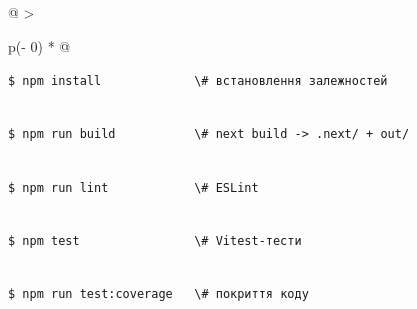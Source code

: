 \documentclass[
]{article}
\newcommand{\passthrough}[1]{#1}
\newcounter{none} %
\begin{document}
{\def\LTcaptype{none} %
\begin{longtable}[]{@{}
  >{\raggedright\arraybackslash}p{}@{}}
\toprule\noalign{}
\endhead
\bottomrule\noalign{}
\endlastfoot
\begin{minipage}[t]{\linewidth}\raggedright
\passthrough{\lstinline!$!}\passthrough{\lstinline! !}\passthrough{\lstinline!npm!}\passthrough{\lstinline! !}\passthrough{\lstinline!install!}\passthrough{\lstinline!             !}\passthrough{\lstinline!\#!}\passthrough{\lstinline! !}\passthrough{\lstinline!встановлення!}\passthrough{\lstinline! !}\passthrough{\lstinline!залежностей!}\strut \\
\passthrough{\lstinline!$!}\passthrough{\lstinline! !}\passthrough{\lstinline!npm!}\passthrough{\lstinline! !}\passthrough{\lstinline!run!}\passthrough{\lstinline! !}\passthrough{\lstinline!build!}\passthrough{\lstinline!           !}\passthrough{\lstinline!\#!}\passthrough{\lstinline! !}\passthrough{\lstinline!next!}\passthrough{\lstinline! !}\passthrough{\lstinline!build!}\passthrough{\lstinline! !}\passthrough{\lstinline!->!}\passthrough{\lstinline! !}\passthrough{\lstinline!.next/!}\passthrough{\lstinline! !}\passthrough{\lstinline!+!}\passthrough{\lstinline! !}\passthrough{\lstinline!out/!}\strut \\
\passthrough{\lstinline!$!}\passthrough{\lstinline! !}\passthrough{\lstinline!npm!}\passthrough{\lstinline! !}\passthrough{\lstinline!run!}\passthrough{\lstinline! !}\passthrough{\lstinline!lint!}\passthrough{\lstinline!            !}\passthrough{\lstinline!\#!}\passthrough{\lstinline! !}\passthrough{\lstinline!ESLint!}\strut \\
\passthrough{\lstinline!$!}\passthrough{\lstinline! !}\passthrough{\lstinline!npm!}\passthrough{\lstinline! !}\passthrough{\lstinline!test!}\passthrough{\lstinline!                !}\passthrough{\lstinline!\#!}\passthrough{\lstinline! !}\passthrough{\lstinline!Vitest-тести!}\strut \\
\passthrough{\lstinline!$!}\passthrough{\lstinline! !}\passthrough{\lstinline!npm!}\passthrough{\lstinline! !}\passthrough{\lstinline!run!}\passthrough{\lstinline! !}\passthrough{\lstinline!test:coverage!}\passthrough{\lstinline!   !}\passthrough{\lstinline!\#!}\passthrough{\lstinline! !}\passthrough{\lstinline!покриття!}\passthrough{\lstinline! !}\passthrough{\lstinline!коду!}\strut
\end{minipage} \\
\end{longtable}
}
\end{document}
